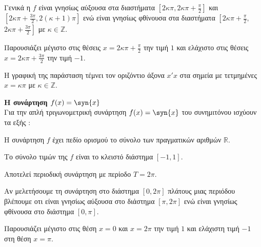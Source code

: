 \documentclass[12pt,landscape]{article}
\begin{document}
\begin{multicols}{3}
\begin{alist}[resume]
\item Γενικά η $ f $ είναι γνησίως αύξουσα στα διαστήματα $ \left[2\kappa\pi,2\kappa\pi+\frac{\pi}{2}\right]$ και $\left[2\kappa\pi+\frac{3\pi}{2},2(\kappa+1)\pi \right]  $ ενώ είναι γνησίως φθίνουσα στα διαστήματα $ \left[2\kappa\pi+\frac{\pi}{2},\right. $  $\left. 2\kappa\pi+\frac{3\pi}{2} \right]  $ με $ \kappa\in\mathbb{Z} $.
\item Παρουσιάζει μέγιστο στις θέσεις $ x=2\kappa\pi+\frac{\pi}{2} $ την τιμή $ 1 $ και ελάχιστο στις θέσεις $ x=2\kappa\pi+\frac{3\pi}{2} $ την τιμή $ -1 $.
\item Η γραφική της παράσταση τέμνει τον οριζόντιο άξονα $ x'x $ στα σημεία με τετμημένες $ x=\kappa\pi $ με $ \kappa\in\mathbb{Z} $.
\end{alist}
\textbf{Η συνάρτηση {\boldmath$ f(x)=\syn{x} $}}\\
Για την απλή τριγωνομετρική συνάρτηση $ f(x)=\syn{x} $ του συνημιτόνου ισχύουν τα εξής :
\begin{alist}
\item Η συνάρτηση $ f $ έχει πεδίο ορισμού το σύνολο των πραγματικών αριθμών $ \mathbb{R} $.
\item Το σύνολο τιμών της $ f $ είναι το κλειστό διάστημα $ [-1,1] $.
\item Αποτελεί περιοδική συνάρτηση με περίοδο $ T=2\pi $.
\item Αν μελετήσουμε τη συνάρτηση στο διάστημα $ [0,2\pi] $ πλάτους μιας περιόδου βλέπουμε οτι είναι γνησίως αύξουσα στο διάστημα $ \left[ \pi,2\pi\right] $ ενώ είναι γνησίως φθίνουσα στο διάστημα $ \left[ 0,\pi\right]  $.
\item Παρουσιάζει μέγιστο στις θέση $ x=0 $ και $ x=2\pi $ την τιμή $ 1 $ και ελάχιστη τιμή $ -1 $ στη θέση $ x=\pi $.
\end{alist}
\begin{center}
\end{center}
\end{multicols}
\end{document}
